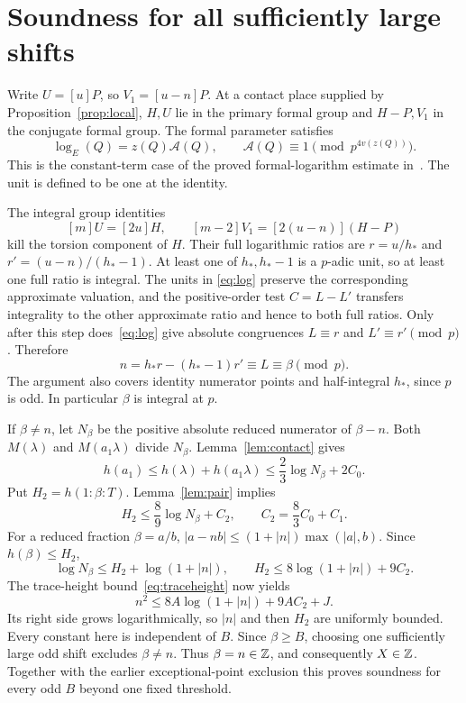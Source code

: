 \documentclass[11pt,a4paper]{article}
\begin{document}
\section{Soundness for all sufficiently large shifts}

Write $U=[u]P$, so $V_1=[u-n]P$. At a contact place supplied by
Proposition~\ref{prop:local}, $H,U$ lie in the primary formal group
and $H-P,V_1$ in the conjugate formal group. The formal parameter satisfies
\begin{equation}\label{eq:log}
 \log_E(Q)=z(Q)\mathcal A(Q),\qquad
 \mathcal A(Q)\equiv1\pmod{p^{4v(z(Q))}}.
\end{equation}
This is the constant-term case of the proved formal-logarithm estimate
in~\cite{Logs}. The unit is defined to be one at the identity.

The integral group identities
\[
                [m]U=[2u]H,\qquad
                [m-2]V_1=[2(u-n)](H-P)
\]
kill the torsion component of $H$. Their full logarithmic ratios are
$r=u/h_*$ and $r'=(u-n)/(h_*-1)$. At least one of $h_*,h_*-1$ is a
$p$-adic unit, so at least one full ratio is integral. The units in
\eqref{eq:log} preserve the corresponding approximate valuation, and
the positive-order test $C=L-L'$ transfers integrality to the other
approximate ratio and hence to both full ratios.
Only after this step does~\eqref{eq:log} give absolute congruences
$L\equiv r$ and $L'\equiv r'\pmod p$. Therefore
\[
 n=h_*r-(h_*-1)r'\equiv L\equiv\beta\pmod p.
\]
The argument also covers identity numerator points and half-integral
$h_*$, since $p$ is odd. In particular $\beta$ is integral at $p$.

If $\beta\ne n$, let $N_\beta$ be the positive absolute reduced
numerator of $\beta-n$. Both $M(\lambda)$ and $M(a_1\lambda)$ divide
$N_\beta$. Lemma~\ref{lem:contact} gives
\[
 h(a_1)\le h(\lambda)+h(a_1\lambda)
               \le\frac23\log N_\beta+2C_0.
\]
Put $H_2=h(1:\beta:T)$. Lemma~\ref{lem:pair} implies
\[
 H_2\le\frac89\log N_\beta+C_2,\qquad C_2=\frac83C_0+C_1.
\]
For a reduced fraction $\beta=a/b$,
$|a-nb|\le(1+|n|)\max(|a|,b)$. Since $h(\beta)\le H_2$,
\[
 \log N_\beta\le H_2+\log(1+|n|),\qquad
 H_2\le8\log(1+|n|)+9C_2.
\]
The trace-height bound~\eqref{eq:traceheight} now yields
\[
 n^2\le8A\log(1+|n|)+9AC_2+J.
\]
Its right side grows logarithmically, so $|n|$ and then $H_2$ are
uniformly bounded. Every constant here is independent of $B$.
Since $\beta\ge B$, choosing one sufficiently large odd shift excludes
$\beta\ne n$. Thus $\beta=n\in\mathbb Z$, and consequently $X\in\mathbb Z$.
Together with the earlier exceptional-point exclusion this proves
soundness for every odd $B$ beyond one fixed threshold.
\end{document}
